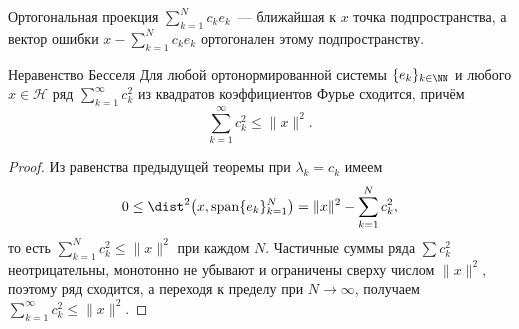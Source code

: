 \begin{center}
\end{center}

Ортогональная проекция $\sum_{k=1}^{N} c_k e_k$~--- ближайшая к $x$ точка подпространства, а вектор ошибки $x - \sum_{k=1}^{N} c_k e_k$ ортогонален этому подпространству.

\begin{Corollary}{Неравенство Бесселя}{}
	Для любой ортонормированной системы $\{e_k\}_{k \in \NN}$ и любого $x \in \mathcal{H}$ ряд $\sum_{k=1}^{\infty} c_k^2$ из квадратов коэффициентов Фурье сходится, причём
	\[
	\sum_{k=1}^{\infty} c_k^2 \le \|x\|^2.
	\]
\end{Corollary}

\begin{proof}
	Из равенства предыдущей теоремы при $\lambda_k = c_k$ имеем
	\[
	0 \le \dist^2\bigl(x, \operatorname{span}\{e_k\}_{k=1}^{N}\bigr) = \|x\|^2 - \sum_{k=1}^{N} c_k^2,
	\]
	то есть $\sum_{k=1}^{N} c_k^2 \le \|x\|^2$ при каждом $N$. Частичные суммы ряда $\sum c_k^2$ неотрицательны, монотонно не убывают и ограничены сверху числом $\|x\|^2$, поэтому ряд сходится, а переходя к пределу при $N \to \infty$, получаем $\sum_{k=1}^{\infty} c_k^2 \le \|x\|^2$.
\end{proof}
